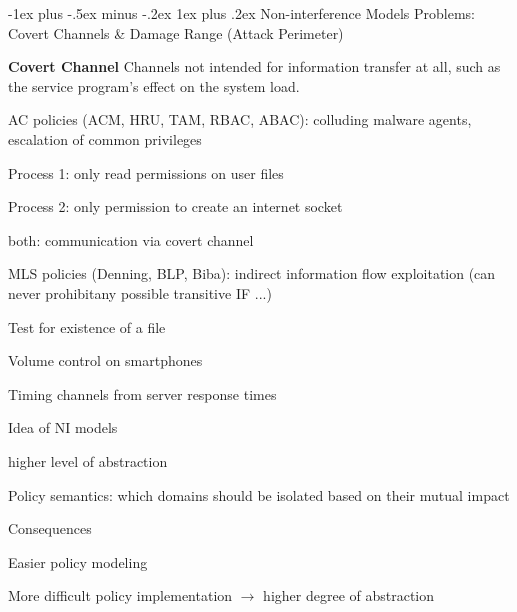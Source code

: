 \documentclass[a4paper]{article}
\makeatletter
\renewcommand{\note}[2]{\begin{noteBox} \textbf{#1} #2 \end{noteBox}}
\renewcommand{\subsubsection}{\@startsection{subsubsection}{3}{0mm}%
                                {-1ex plus -.5ex minus -.2ex}%
                                {1ex plus .2ex}%
                                {\normalfont\small\bfseries}}
\makeatother
\begin{document}
\begin{multicols}{3}
    \subsubsection{Non-interference Models}
    Problems: Covert Channels \& Damage Range (Attack Perimeter)

    \note{Covert Channel}{Channels not intended for information transfer at all, such as the service program’s effect on the system load.}

    \begin{itemize*}
        \item AC policies (ACM, HRU, TAM, RBAC, ABAC): colluding malware agents, escalation of common privileges
        \begin{itemize*}
            \item Process 1: only read permissions on user files
            \item Process 2: only permission to create an internet socket
            \item both: communication via covert channel
        \end{itemize*}
        \item MLS policies (Denning, BLP, Biba): indirect information flow exploitation (can never prohibitany possible transitive IF ...)
        \begin{itemize*}
            \item Test for existence of a file
            \item Volume control on smartphones
            \item Timing channels from server response times
        \end{itemize*}
    \end{itemize*}

    Idea of NI models
    \begin{itemize*}
        \item higher level of abstraction
        \item Policy semantics: which domains should be isolated based on their mutual impact
    \end{itemize*}

    Consequences
    \begin{itemize*}
        \item Easier policy modeling
        \item More difficult policy implementation $\rightarrow$ higher degree of abstraction
    \end{itemize*}


\end{multicols}
\end{document}
